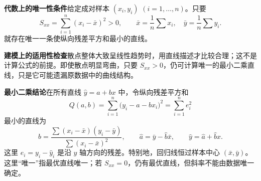 \begin{statementbox}
\textbf{代数上的唯一性条件}\quad 给定成对样本 $(x_i,y_i)$ $(i=1,\ldots,n)$。只要
\[
 S_{xx}=\sum_{i=1}^n(x_i-\bar x)^2>0,
 \qquad \bar x=\frac1n\sum x_i,\quad\bar y=\frac1n\sum y_i.
\]
就存在唯一一条使纵向残差平方和最小的直线。

\textbf{建模上的适用性检查}\quad 散点整体大致呈线性趋势时，用直线描述才比较合理；这不是计算公式的前提。即使散点明显弯曲，只要 $S_{xx}>0$，仍可计算唯一的最小二乘直线，只是它可能遗漏原数据中的曲线结构。


\textbf{最小二乘结论}\quad 在所有直线 $\hat y=a+bx$ 中，令纵向残差平方和
\[
 Q(a,b)=\sum_{i=1}^n\bigl(y_i-a-bx_i\bigr)^2=\sum_{i=1}^n e_i^2
\]
最小的直线为
\[
 \boxed{\hat b=\frac{\sum(x_i-\bar x)(y_i-\bar y)}{\sum(x_i-\bar x)^2}},
 \qquad \boxed{\hat a=\bar y-\hat b\bar x},\qquad \hat y=\hat a+\hat b x.
\]
这里 $e_i=y_i-\hat y_i$ 是沿 $y$ 轴方向的残差。特别地，回归线恒过样本中心 $(\bar x,\bar y)$。这里“唯一”指最优直线唯一；若 $S_{xx}=0$，仍有最优直线，但斜率不能由数据唯一确定。
\end{statementbox}
